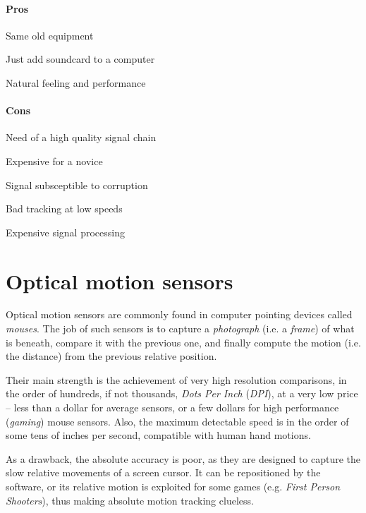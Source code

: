 \documentclass[a4paper,10pt]{article}
\begin{document}
\begin{multicols}{2}
\paragraph{Pros}
\begin{itemize*}
	\item Same old equipment
	\item Just add soundcard to a computer
	\item Natural feeling and performance
\end{itemize*}


\paragraph{Cons}
\begin{itemize*}
	\item Need of a high quality signal chain
	\item Expensive for a novice
	\item Signal subsceptible to corruption
	\item Bad tracking at low speeds
	\item Expensive signal processing
\end{itemize*}


\section{Optical motion sensors}
\label{sec:mouse_sensors}

Optical motion sensors are commonly found in computer pointing devices called
\emph{mouses}. The job of such sensors is to capture a \emph{photograph}
(i.e. a \emph{frame}) of what is beneath, compare it with the previous one,
and finally compute the motion (i.e. the distance) from the previous relative
position.

Their main strength is the achievement of very high resolution comparisons, in
the order of hundreds, if not thousands, \emph{Dots Per Inch} (\emph{DPI}), at
a very low price -- less than a dollar for average sensors, or a few dollars
for high performance (\emph{gaming}) mouse sensors. Also, the maximum
detectable speed is in the order of some tens of inches per second, compatible
with human hand motions.

As a drawback, the absolute accuracy is poor, as they are designed to capture
the slow relative movements of a screen cursor. It can be repositioned by
the software, or its relative motion is exploited for some games (e.g.
\emph{First Person Shooters}), thus making absolute motion tracking clueless.


\end{multicols}
\end{document}
